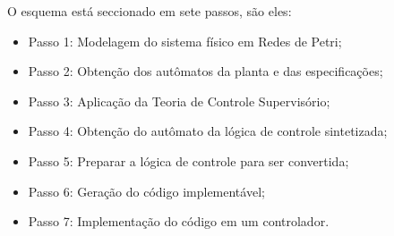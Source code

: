  O esquema est\'a seccionado em sete passos, s\~ao eles:
 
 \begin{itemize}
 	\item Passo 1: Modelagem do sistema f\'isico em Redes de Petri;
 	\item Passo 2: Obten\c{c}\~ao dos aut\^omatos da planta e das especifica\c{c}\~oes;
 	\item Passo 3: Aplica\c{c}\~ao da Teoria de Controle Supervis\'orio;
 	\item Passo 4: Obten\c{c}\~ao do aut\^omato da l\'ogica de controle sintetizada;
 	\item Passo 5: Preparar a l\'ogica de controle para ser convertida;
 	\item Passo 6: Gera\c{c}\~ao do c\'odigo implement\'avel;
 	\item Passo 7: Implementa\c{c}\~ao do c\'odigo em um controlador.
 \end{itemize}

